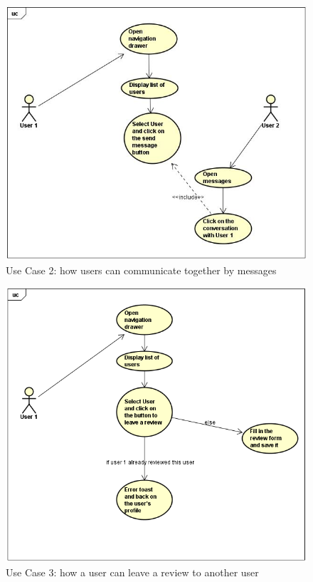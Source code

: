 \documentclass[paper=a4, fontsize=12pt,DIV=14]{scrartcl}    %
\begin{document}
		                \begin{figure}[!htbp]
		                    \center
		                    \includegraphics[scale=0.7]{img/send_message.png}
		                    \caption{Use Case 2: how users can communicate together by messages}
		                \end{figure}

		                \begin{figure}[!htbp]
		                    \center
		                    \includegraphics[scale=0.7]{img/leave_review.png}
		                    \caption{Use Case 3: how a user can leave a review to another user}
		                \end{figure}
\end{document}
